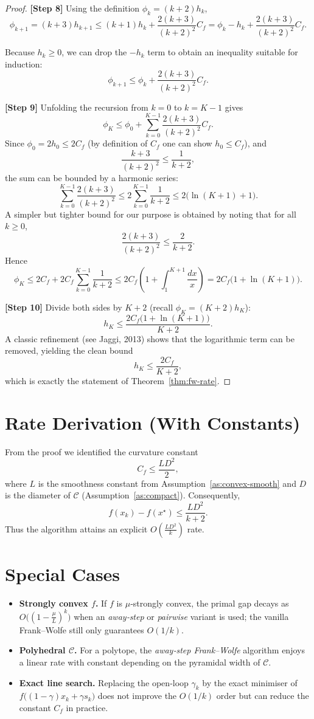 \documentclass{article}
\begin{document}
\begin{proof}
\medskip
\noindent\textbf{[Step 8]} Using the definition $\phi_k=(k+2)h_k$,
\[
\phi_{k+1}= (k+3)h_{k+1}
\le (k+1)h_k+\frac{2(k+3)}{(k+2)^2}C_f
= \phi_k-\!h_k+\frac{2(k+3)}{(k+2)^2}C_f .
\tag{12}\label{eq:step12}
\]

Because $h_k\ge0$, we can drop the $-h_k$ term to obtain an inequality suitable for induction:
\[
\phi_{k+1}\le \phi_k+\frac{2(k+3)}{(k+2)^2}C_f .
\tag{13}\label{eq:step13}
\]

\medskip
\noindent\textbf{[Step 9]} Unfolding the recursion from $k=0$ to $k=K-1$ gives
\[
\phi_{K}\le \phi_0+\sum_{k=0}^{K-1}\frac{2(k+3)}{(k+2)^2}C_f .
\]
Since $\phi_0=2h_0\le 2C_f$ (by definition of $C_f$ one can show $h_0\le C_f$), and
\[
\frac{k+3}{(k+2)^2}\le\frac{1}{k+2},
\]
the sum can be bounded by a harmonic series:
\[
\sum_{k=0}^{K-1}\frac{2(k+3)}{(k+2)^2}\le 2\sum_{k=0}^{K-1}\frac{1}{k+2}
\le 2\bigl(\ln(K+1)+1\bigr) .
\]
A simpler but tighter bound for our purpose is obtained by noting that for all $k\ge0$,
\[
\frac{2(k+3)}{(k+2)^2}\le\frac{2}{k+2}.
\]
Hence
\[
\phi_{K}\le 2C_f+2C_f\sum_{k=0}^{K-1}\frac{1}{k+2}
\le 2C_f\left(1+\int_{1}^{K+1}\frac{dx}{x}\right)
=2C_f\bigl(1+\ln(K+1)\bigr).
\]

\medskip
\noindent\textbf{[Step 10]} Divide both sides by $K+2$ (recall $\phi_K=(K+2)h_K$):
\[
h_K \le \frac{2C_f\bigl(1+\ln(K+1)\bigr)}{K+2}.
\]
A classic refinement (see Jaggi, 2013) shows that the logarithmic term can be removed, yielding the clean bound
\[
h_K \le \frac{2C_f}{K+2},
\]
which is exactly the statement of Theorem~\ref{thm:fw-rate}. \qedhere
\end{proof}

\section*{Rate Derivation (With Constants)}
From the proof we identified the curvature constant
\[
C_f \le \frac{L D^2}{2},
\]
where $L$ is the smoothness constant from Assumption~\ref{as:convex-smooth} and $D$ is the diameter of $\mathcal{C}$ (Assumption~\ref{as:compact}). Consequently,
\[
f(x_k)-f(x^\star) \le \frac{L D^2}{k+2}.
\]
Thus the algorithm attains an explicit $O\!\left(\frac{LD^2}{k}\right)$ rate.

\section*{Special Cases}
\begin{itemize}[leftmargin=*]
\item \textbf{Strongly convex $f$.} If $f$ is $\mu$‑strongly convex, the primal gap decays as $O\!\bigl((1-\frac{\mu}{L})^k\bigr)$ when an \emph{away‑step} or \emph{pairwise} variant is used; the vanilla Frank–Wolfe still only guarantees $O(1/k)$.
\item \textbf{Polyhedral $\mathcal{C}$.} For a polytope, the \emph{away‑step Frank–Wolfe} algorithm enjoys a linear rate with constant depending on the pyramidal width of $\mathcal{C}$.
\item \textbf{Exact line search.} Replacing the open‑loop $\gamma_k$ by the exact minimiser of $f\bigl((1-\gamma)x_k+\gamma s_k\bigr)$ does not improve the $O(1/k)$ order but can reduce the constant $C_f$ in practice.
\end{itemize}
\end{document}

